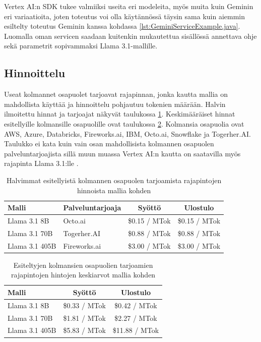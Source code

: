 Vertex AI:n SDK tukee valmiiksi useita eri modeleita, myös muita kuin Geminin
eri variaatioita, joten toteutus voi olla käytännössä täysin sama kuin aiemmin
esiltelty toteutus Geminin kanssa kohdassa \ref{lst:GeminiServiceExample.java}.
Luomalla oman servicen saadaan kuitenkin mukautettua sisällössä annettava ohje
sekä parametrit sopivammaksi Llama 3.1-mallille.

\subsection{Hinnoittelu}

Useat kolmannet osapuolet tarjoavat rajapinnan, jonka kautta mallia on
mahdollista käyttää ja hinnoittelu pohjautuu tokenien määrään. Halvin
ilmoitettu hinnat ja tarjoajat näkyvät taulukossa
\ref{tab:third-party-llama-prices}. Keskimääräiset hinnat esitellyille
kolmansille osapuolille ovat taulukossa \ref{tab:third-party-llama-prices-2}.
Kolmansia osapuolia ovat AWS, Azure, Databricks, Fireworks.ai, IBM, Octo.ai,
Snowflake ja Togerher.AI. \parencite{llama} Taulukko ei kata kuin vain osan
mahdollisista kolmannen osapuolen palveluntarjoajista sillä muun muassa
Vertex AI:n kautta on saatavilla myös rajapinta Llama 3.1:lle
\parencite{vertexAiModelGardenLlama3}.

\begin{table}[H]
  \centering
  \caption{Halvimmat esitellyistä kolmannen osapuolen tarjoamista rajapintojen hinnoista mallia kohden \parencite{llama}}
  \label{tab:third-party-llama-prices}
  \begin{tabular}{llcc}
    \textbf{Malli} & \textbf{Palveluntarjoaja} & \textbf{Syöttö} & \textbf{Ulostulo} \\
    \hline
    Llama 3.1 8B   & Octo.ai      & \$0.15 / MTok & \$0.15 / MTok \\
    Llama 3.1 70B  & Togerher.AI  & \$0.88 / MTok & \$0.88 / MTok \\
    Llama 3.1 405B & Fireworks.ai & \$3.00 / MTok & \$3.00 / MTok \\
    \hline
  \end{tabular}
\end{table}

\begin{table}[H]
  \centering
  \caption{Esiteltyjen kolmansien osapuolien tarjoamien rajapintojen hintojen keskiarvot mallia kohden \parencite{llama}}
  \label{tab:third-party-llama-prices-2}
  \begin{tabular}{lcc}
    \textbf{Malli} & \textbf{Syöttö} & \textbf{Ulostulo} \\
    \hline
    Llama 3.1 8B   & \$0.33 / MTok &  \$0.42 / MTok \\
    Llama 3.1 70B  & \$1.81 / MTok &  \$2.27 / MTok \\
    Llama 3.1 405B & \$5.83 / MTok & \$11.88 / MTok \\
    \hline
  \end{tabular}
\end{table}

